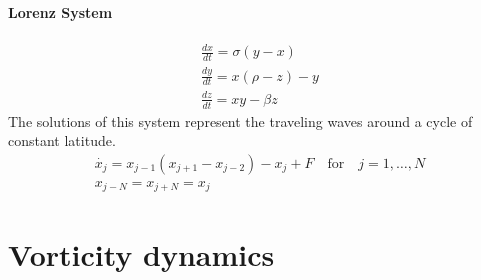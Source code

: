 \paragraph{Lorenz System}
\begin{align}\label{eq.lorenz system}
	\frac{dx}{dt}=\sigma(y-x) \\
	\frac{dy}{dt}=x(\rho-z)-y \\
	\frac{dz}{dt}=xy-\beta z
\end{align}
The solutions of this system represent the traveling waves around a cycle of constant latitude.
\begin{align*}
	\dot{x_j}=x_{j-1}(x_{j+1}-x_{j-2})-x_j+F \quad \text{for} \quad j=1,\dots,N \\
	x_{j-N}=x_{j+N}=x_j
\end{align*}
\section{Vorticity dynamics}
